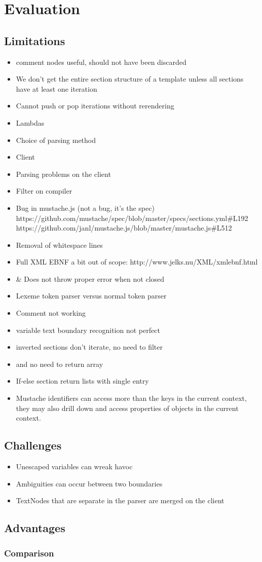 \documentclass[thesis.tex]{subfiles}
\begin{document}
\chapter{Evaluation}
\label{chap:eval}
\section{Limitations}
\begin{itemize}
\item comment nodes useful, should not have been discarded
\item We don't get the entire section structure of a template unless all
      sections have at least one iteration
\item Cannot push or pop iterations without rerendering
\item Lambdas
\item Choice of parsing method
\item Client
\item Parsing problems on the client
\item Filter on compiler
\item Bug in mustache.js (not a bug, it's the spec)
      https://github.com/mustache/spec/blob/master/specs/sections.yml\#L192
      https://github.com/janl/mustache.js/blob/master/mustache.js\#L512
\item Removal of whitespace lines
\item Full XML EBNF a bit out of scope: http://www.jelks.nu/XML/xmlebnf.html
\item \& Does not throw proper error when not closed
\item Lexeme token parser versus normal token parser
\item Comment not working
\item variable text boundary recognition not perfect
\item inverted sections don't iterate, no need to filter
\item and no need to return array
\item If-else section return lists with single entry
\item Mustache identifiers can access more than the keys in the current context,
      they may also drill down and access properties of objects in the current
      context.
\end{itemize}

\section{Challenges}
\begin{itemize}
\item Unescaped variables can wreak havoc
\item Ambiguities can occur between two boundaries
\item TextNodes that are separate in the parser are merged on the client
\end{itemize}
\section{Advantages}
\subsection{Comparison}
\end{document}
